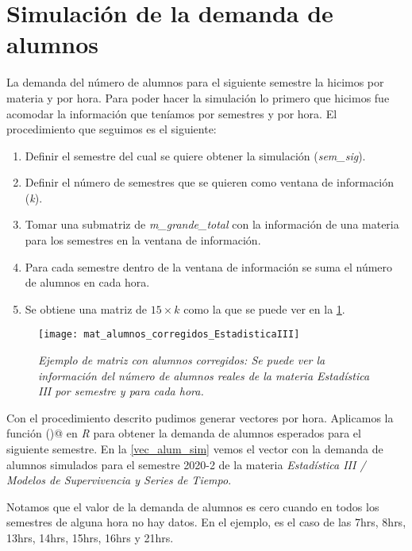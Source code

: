 \section{Simulación de la demanda de alumnos} \label{SimDemandaAlumnos}

La demanda del número de alumnos para el siguiente semestre la hicimos por materia y por hora. Para poder hacer la simulación lo primero que hicimos fue acomodar la información que teníamos por semestres y por hora. El procedimiento que seguimos es el siguiente:

\begin{enumerate}
\item Definir el semestre del cual se quiere obtener la simulación (\textit{sem\_sig}).

\item Definir el número de semestres que se quieren como ventana de información (\textit{k}).

\item Tomar una submatriz de \textit{m\_grande\_total} con la información de una materia para los semestres en la ventana de información.

\item Para cada semestre dentro de la ventana de información se suma el número de alumnos en cada hora.

\item Se obtiene una matriz de $15 \times k$ como la que se puede ver en la \figurename{\ref{matAl_corregidos}}.
\end{enumerate}

\begin{figure}[H]
\centering
\texttt{[image: mat\_alumnos\_corregidos\_EstadisticaIII]} %
\caption[\textit{Ejemplo de matriz con alumnos corregidos}]{\textit{Ejemplo de matriz con alumnos corregidos: Se puede ver la información del número de alumnos reales de la materia Estadística III por semestre y para cada hora.}}\label{matAl_corregidos}
\end{figure}

Con el procedimiento descrito pudimos generar vectores por hora. Aplicamos la función \verb@hw()@ en \textit{R} para obtener la demanda de alumnos esperados para el siguiente semestre. En la \figurename{\ref{vec_alum_sim}} vemos el vector con la demanda de alumnos simulados para el semestre 2020-2 de la materia \textit{Estadística III / Modelos de Supervivencia y Series de Tiempo}.

Notamos que el valor de la demanda de alumnos es cero cuando en todos los semestres de alguna hora no hay datos. En el ejemplo, es el caso de las 7hrs, 8hrs, 13hrs, 14hrs, 15hrs, 16hrs y 21hrs.


